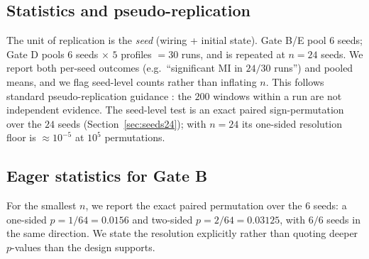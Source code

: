 \documentclass[10pt,a4paper]{article}
\begin{document}
\subsection{Statistics and pseudo-replication}\label{sec:stats}

The unit of replication is the \emph{seed} (wiring + initial state).
Gate B/E pool $6$ seeds; Gate D pools $6$ seeds $\times$ $5$ profiles
$=30$ runs, and is repeated at $n=24$ seeds. We report both per-seed
outcomes (e.g.\ ``significant MI in $24/30$ runs'') and pooled means,
and we flag seed-level counts rather than inflating $n$. This follows
standard pseudo-replication guidance \cite{hurlbert1984}: the $200$
windows within a run are not independent evidence. The seed-level test
is an exact paired sign-permutation over the $24$ seeds
(Section~\ref{sec:seeds24}); with $n=24$ its one-sided resolution floor
is $\approx10^{-5}$ at $10^5$ permutations.

\subsection{Eager statistics for Gate B}\label{sec:gatebstat}

For the smallest $n$, we report the exact paired permutation over the
$6$ seeds: a one-sided $p=1/64=0.0156$ and two-sided $p=2/64=0.03125$,
with $6/6$ seeds in the same direction. We state the resolution
explicitly rather than quoting deeper $p$-values than the design
supports.
\end{document}
